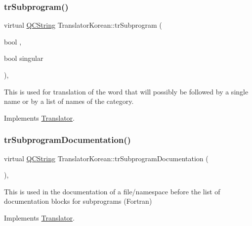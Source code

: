 \mbox{\label{class_translator_korean_a78b10bbfbcbdf7f747c0dc98944e2686}} 
\subsubsection{\texorpdfstring{trSubprogram()}{trSubprogram()}}
{\footnotesize\ttfamily virtual \mbox{\hyperlink{class_q_c_string}{Q\+C\+String}} Translator\+Korean\+::tr\+Subprogram (\begin{DoxyParamCaption}\item[{bool}]{,  }\item[{bool}]{singular }\end{DoxyParamCaption})\hspace{0.3cm}{\ttfamily [inline]}, {\ttfamily [virtual]}}

This is used for translation of the word that will possibly be followed by a single name or by a list of names of the category. 

Implements \mbox{\hyperlink{class_translator}{Translator}}.

\mbox{\label{class_translator_korean_a906183f849589c0a52239fb9714b8421}} 
\subsubsection{\texorpdfstring{trSubprogramDocumentation()}{trSubprogramDocumentation()}}
{\footnotesize\ttfamily virtual \mbox{\hyperlink{class_q_c_string}{Q\+C\+String}} Translator\+Korean\+::tr\+Subprogram\+Documentation (\begin{DoxyParamCaption}{ }\end{DoxyParamCaption})\hspace{0.3cm}{\ttfamily [inline]}, {\ttfamily [virtual]}}

This is used in the documentation of a file/namespace before the list of documentation blocks for subprograms (Fortran) 

Implements \mbox{\hyperlink{class_translator}{Translator}}.

\mbox{\label{class_translator_korean_a1c8be8fe694bfd04194706b9c41e04ac}} 
